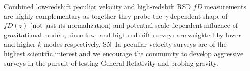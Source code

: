 \documentclass[11pt, oneside]{article}   	%
\begin{document}
Combined low-redshift peculiar velocity and high-redshift RSD $fD$ measurements are highly complementary as together they probe the
$\gamma$-dependent shape of $fD(z)$ (not just its normalization) and potential scale-dependent influence of gravitational models, since low-
and high-redshift surveys are weighted by lower and higher $k$-modes respectively.
SN~Ia peculiar velocity surveys are of the highest scientific
interest and we encourage
the community to develop aggressive surveys in the pursuit of testing  General Relativity and probing gravity. 





\end{document}
